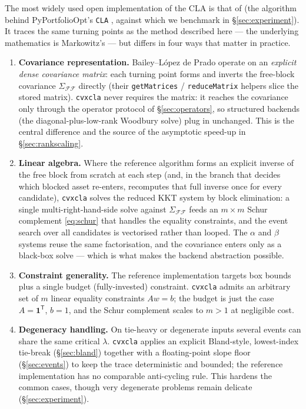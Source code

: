 \documentclass[11pt]{article}
\newcommand{\Sig}{\Sigma}
\newcommand{\F}{\mathcal{F}}        %
\newcommand{\trans}{^{\mathsf{T}}}
\begin{document}
The most widely used open implementation of the CLA is that of
\citet{bailey2013} (the algorithm behind PyPortfolioOpt's \texttt{CLA}
\citep{pyportfolioopt}, against which we benchmark in \S\ref{sec:experiment}).
It traces the same turning points as the method described here --- the
underlying mathematics is Markowitz's --- but differs in four ways that matter in
practice.

\begin{enumerate}
\item \textbf{Covariance representation.} Bailey--L\'opez de Prado operate on an
\emph{explicit dense covariance matrix}: each turning point forms and inverts the
free-block covariance $\Sig_{\F\F}$ directly (their \texttt{getMatrices} /
\texttt{reduceMatrix} helpers slice the stored matrix). \texttt{cvxcla} never
requires the matrix: it reaches the covariance only through the operator protocol
of \S\ref{sec:operators}, so structured backends (the diagonal-plus-low-rank
Woodbury solve) plug in unchanged. This is the central difference and the source
of the asymptotic speed-up in \S\ref{sec:rankscaling}.

\item \textbf{Linear algebra.} Where the reference algorithm forms an explicit
inverse of the free block from scratch at each step (and, in the branch that
decides which blocked asset re-enters, recomputes that full inverse once for every
candidate), \texttt{cvxcla} solves the reduced KKT system by block elimination: a
single multi-right-hand-side solve against $\Sig_{\F\F}$ feeds an $m \times m$
Schur complement \eqref{eq:schur} that handles the equality constraints, and the
event search over all candidates is vectorised rather than looped. The $\alpha$
and $\beta$ systems reuse the same factorisation, and the covariance enters only
as a black-box solve --- which is what makes the backend abstraction possible.

\item \textbf{Constraint generality.} The reference implementation targets box
bounds plus a single budget (fully-invested) constraint. \texttt{cvxcla} admits
an arbitrary set of $m$ linear equality constraints $A w = b$; the budget is just
the case $A = \mathbf{1}\trans$, $b = 1$, and the Schur complement scales to
$m > 1$ at negligible cost.

\item \textbf{Degeneracy handling.} On tie-heavy or degenerate inputs several
events can share the same critical $\lambda$. \texttt{cvxcla} applies an explicit
Bland-style, lowest-index tie-break (\S\ref{sec:bland}) together with a
floating-point slope floor (\S\ref{sec:events}) to keep the trace deterministic
and bounded; the reference implementation has no comparable anti-cycling rule.
This hardens the common cases, though very degenerate problems remain delicate
(\S\ref{sec:experiment}).
\end{enumerate}
\end{document}

